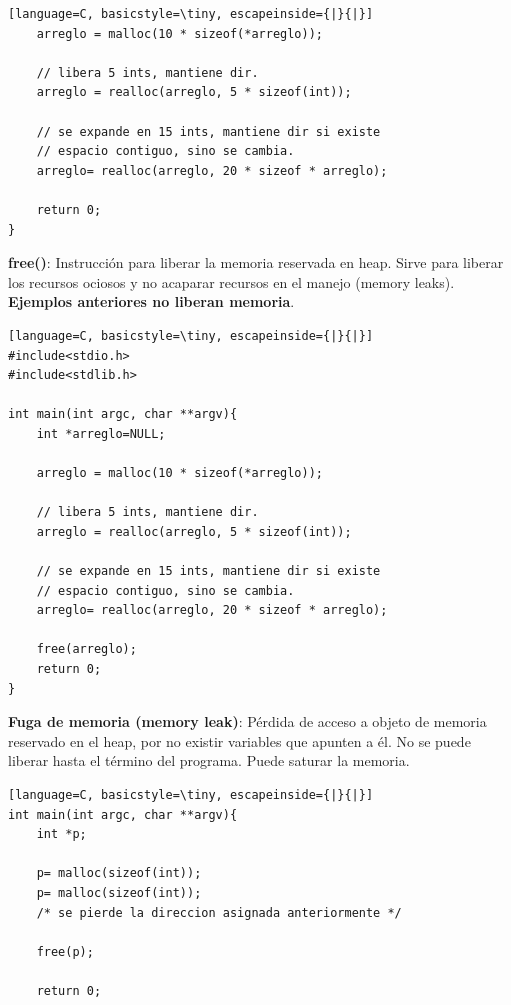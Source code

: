 \documentclass{article}
\begin{document}
\begin{itemize}
\begin{minipage}[h]{0.45\textwidth}
\begin{lstlisting}[language=C, basicstyle=\tiny, escapeinside={|}{|}]
	arreglo = malloc(10 * sizeof(*arreglo));

	// libera 5 ints, mantiene dir.
	arreglo = realloc(arreglo, 5 * sizeof(int));

	// se expande en 15 ints, mantiene dir si existe
	// espacio contiguo, sino se cambia.
	arreglo= realloc(arreglo, 20 * sizeof * arreglo);

	return 0;
}
\end{lstlisting}
\end{minipage}
\hspace{0.5cm}
\begin{minipage}[h]{0.45\textwidth}
\item \textbf{free()}: Instrucción para liberar la memoria reservada en heap. Sirve para liberar los recursos ociosos y no acaparar recursos en el manejo (memory leaks). \textbf{Ejemplos anteriores no liberan memoria}.

\begin{lstlisting}[language=C, basicstyle=\tiny, escapeinside={|}{|}]
#include<stdio.h>
#include<stdlib.h>

int main(int argc, char **argv){
	int *arreglo=NULL;

	arreglo = malloc(10 * sizeof(*arreglo));

	// libera 5 ints, mantiene dir.
	arreglo = realloc(arreglo, 5 * sizeof(int));

	// se expande en 15 ints, mantiene dir si existe
	// espacio contiguo, sino se cambia.
	arreglo= realloc(arreglo, 20 * sizeof * arreglo);

	free(arreglo);
	return 0;
}
\end{lstlisting}
\end{minipage}

\begin{minipage}[h]{0.45\textwidth}
\item \textbf{Fuga de memoria (memory leak)}: Pérdida de acceso a objeto de memoria reservado en el heap, por no existir variables que apunten a él. No se puede liberar hasta el término del programa. Puede saturar la memoria.
\begin{lstlisting}[language=C, basicstyle=\tiny, escapeinside={|}{|}]
int main(int argc, char **argv){
	int *p;
	
	p= malloc(sizeof(int));
	p= malloc(sizeof(int));
	/* se pierde la direccion asignada anteriormente */

	free(p);

	return 0;
\end{lstlisting}


\end{minipage}
\end{itemize}
\end{document}
